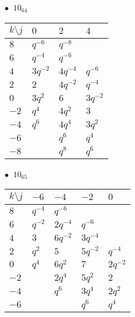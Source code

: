 %
\begin{minipage}{\linewidth}
$\bullet\ $ $10_{64}$ \vspace{0.5em} \\
\begin{tabular}{l|lll}
$k \setminus j$ & $0$ & $2$ & $4$ \\
\hline
$8$ & $q^{-6}$ & $q^{-8}$ &  \\
$6$ & $q^{-4}$ & $q^{-6}$ &  \\
$4$ & $3q^{-2}$ & $4q^{-4}$ & $q^{-6}$ \\
$2$ & $2$ & $4q^{-2}$ & $q^{-4}$ \\
$0$ & $3q^{2}$ & $6$ & $3q^{-2}$ \\
$-2$ & $q^{4}$ & $4q^{2}$ & $3$ \\
$-4$ & $q^{6}$ & $4q^{4}$ & $3q^{2}$ \\
$-6$ &  & $q^{6}$ & $q^{4}$ \\
$-8$ &  & $q^{8}$ & $q^{6}$ \\
\end{tabular}
\vspace{2em}
\end{minipage}
%
\begin{minipage}{\linewidth}
$\bullet\ $ $10_{65}$ \vspace{0.5em} \\
\begin{tabular}{l|llll}
$k \setminus j$ & $-6$ & $-4$ & $-2$ & $0$ \\
\hline
$8$ & $q^{-4}$ & $q^{-6}$ &  &  \\
$6$ & $q^{-2}$ & $2q^{-4}$ & $q^{-6}$ &  \\
$4$ & $3$ & $6q^{-2}$ & $3q^{-4}$ &  \\
$2$ & $q^{2}$ & $5$ & $5q^{-2}$ & $q^{-4}$ \\
$0$ & $q^{4}$ & $6q^{2}$ & $7$ & $2q^{-2}$ \\
$-2$ &  & $2q^{4}$ & $5q^{2}$ & $2$ \\
$-4$ &  & $q^{6}$ & $3q^{4}$ & $2q^{2}$ \\
$-6$ &  &  & $q^{6}$ & $q^{4}$ \\
\end{tabular}
\vspace{2em}
\end{minipage}
%

